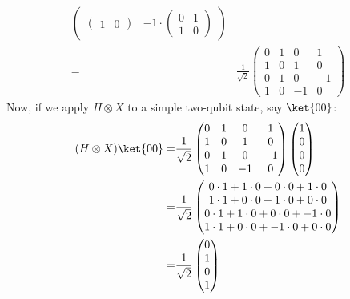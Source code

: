 \begin{examplebox}[: $H \otimes X$]
\begin{align*}
\begin{pmatrix}
\begin{pmatrix}
                1 & 0
            \end{pmatrix} & -1 \cdot \begin{pmatrix}
                0 & 1 \\
                1 & 0
            \end{pmatrix}
        \end{pmatrix} \\
        =& \frac{1}{\sqrt{2}} \begin{pmatrix}
            0 & 1 & 0 & 1 \\
            1 & 0 & 1 & 0 \\
            0 & 1 & 0 & -1 \\
            1 & 0 & -1 & 0
        \end{pmatrix}
    \end{align*}
    Now, if we apply $H \otimes X$ to a simple two-qubit state, say $\ket{00}$:
    \begin{align*}
        (H \otimes X)\ket{00} =& \frac{1}{\sqrt{2}} \begin{pmatrix}
            0 & 1 & 0 & 1 \\
            1 & 0 & 1 & 0 \\
            0 & 1 & 0 & -1 \\
            1 & 0 & -1 & 0
        \end{pmatrix} \begin{pmatrix}
            1 \\
            0 \\
            0 \\
            0
        \end{pmatrix} \\
        =& \frac{1}{\sqrt{2}} \begin{pmatrix}
            0 \cdot 1 + 1 \cdot 0 + 0 \cdot 0 + 1 \cdot 0 \\
            1 \cdot 1 + 0 \cdot 0 + 1 \cdot 0 + 0 \cdot 0 \\
            0 \cdot 1 + 1 \cdot 0 + 0 \cdot 0 + -1 \cdot 0 \\
            1 \cdot 1 + 0 \cdot 0 + -1 \cdot 0 + 0 \cdot 0
        \end{pmatrix} \\
        =& \frac{1}{\sqrt{2}} \begin{pmatrix}
            0 \\
            1 \\
            0 \\
            1
        \end{pmatrix} \\

\end{align*}
\end{examplebox}
